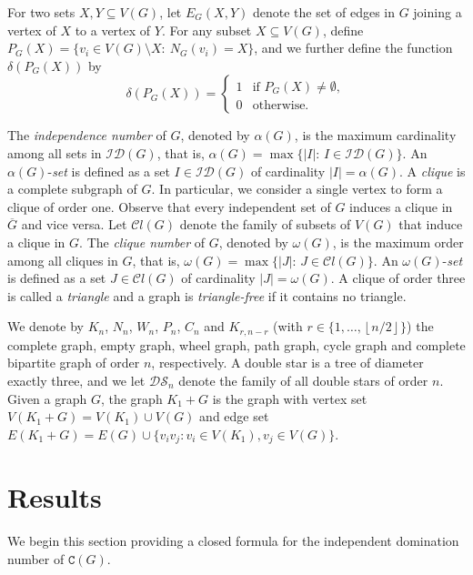 \documentclass[12pt]{article}
\begin{document}
\vspace{.1cm}

\noindent
For two sets $X,Y\subseteq V(G)$, let $E_G(X,Y)$ denote the set of edges in $G$ joining a vertex of $X$ to a vertex of $Y$. For any subset $X\subseteq V(G)$, define $P_G(X) = \{v_i \in V(G)\setminus X:\ N_G(v_i) = X\}$, and we further define the function $\delta(P_G(X))$ by 
$$\delta(P_{G}(X)) = 
\begin{cases}
1 & \text{if } P_{G}(X) \neq \emptyset, \\[4pt]
0 & \text{otherwise.}
\end{cases}$$	

\noindent
The \emph{independence number} of $G$, denoted by $\alpha(G)$, is the maximum cardinality among all sets in $\mathcal{ID}(G)$, that is, $\alpha(G)=\max\{|I|:\, I\in \mathcal{ID}(G)\}.$ 
An $\alpha(G)$-\emph{set} is defined as a set $I\in \mathcal{ID}(G)$ of cardinality $|I|=\alpha(G)$.
A \emph{clique} is a complete subgraph of $G$. In particular, we consider a single vertex to form a clique of order one. Observe that every independent set of $G$ induces
a clique in $\overline{G}$ and vice versa. Let $\mathcal{C}l(G)$ denote the family of subsets of $V(G)$ that induce a clique in $G$. The \emph{clique number} of $G$, denoted by $\omega(G)$, is the maximum order among all cliques in $G$, that is, $\omega(G)=\max\{|J|:\, J\in \mathcal{C}l(G)\}$. An $\omega(G)$-\emph{set} is defined as a set $J\in \mathcal{C}l(G)$ of cardinality $|J|=\omega(G)$. A clique of order three is called a \emph{triangle} and a graph is \emph{triangle-free} if it contains no triangle. 

\vspace{.1cm}

\noindent
We denote by $K_n$, $N_n$, $W_n$, $P_n$, $C_n$ and $K_{r,n-r}$ (with $r\in \{1, \ldots ,\left\lfloor n/2\right\rfloor\}$) the complete graph, empty graph, wheel graph, path graph, cycle graph and complete bipartite graph of order $n$, respectively. A double star is a tree of diameter exactly three, and we let $\mathcal{DS}_n$ denote the family of all double stars of order $n$. Given a graph $G$, the graph $K_1+G$ is the graph with vertex set $V(K_1+G)=V(K_1)\cup V(G)$ and edge set $E(K_1+G)=E(G)\cup \{v_iv_j: v_i\in V(K_1), v_j\in V(G)\}$.

\section{Results}

We begin this section providing a closed formula for the independent domination number of $\mathtt{C}(G)$. 
	
\end{document}
